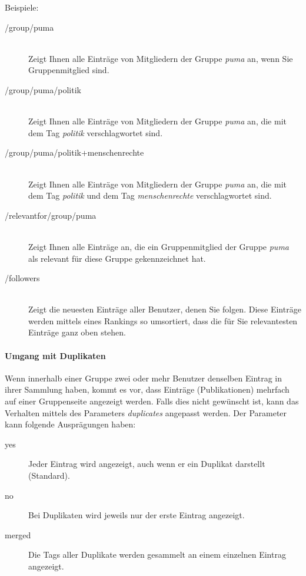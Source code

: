 Beispiele:
\begin{description}
    \item [/group/puma] \hfill \\
    Zeigt Ihnen alle Einträge von Mitgliedern der Gruppe \textit{puma} an, wenn Sie Gruppenmitglied sind.
    \item [/group/puma/politik] \hfill \\
    Zeigt Ihnen alle Einträge von Mitgliedern der Gruppe \textit{puma} an, die mit dem Tag \textit{politik} verschlagwortet sind. 
    \item [/group/puma/politik+menschenrechte] \hfill \\
    Zeigt Ihnen alle Einträge von Mitgliedern der Gruppe \textit{puma} an, die mit dem Tag \textit{politik} und dem Tag \textit{menschenrechte} verschlagwortet sind. 
    \item [/relevantfor/group/puma] \hfill \\
    Zeigt Ihnen alle Einträge an, die ein Gruppenmitglied der Gruppe \textit{puma} als relevant für diese Gruppe gekennzeichnet hat.
    \item [/followers] \hfill \\
    Zeigt die neuesten Einträge aller Benutzer, denen Sie folgen. Diese Einträge werden mittels eines Rankings so umsortiert, dass die für Sie relevantesten Einträge ganz oben stehen. 
\end{description}



\paragraph*{Umgang mit Duplikaten}
\label{subsec:duplikate}
Wenn innerhalb einer Gruppe zwei oder mehr Benutzer denselben Eintrag in ihrer Sammlung haben, kommt es vor, dass Einträge (Publikationen) mehrfach auf einer Gruppenseite angezeigt werden. Falls dies nicht gewünscht ist, kann das Verhalten mittels des Parameters \textit{duplicates} angepasst werden. Der Parameter kann folgende Ausprägungen haben:
\begin{description}
\item [yes] Jeder Eintrag wird angezeigt, auch wenn er ein Duplikat darstellt (Standard).
  \item[no] Bei Duplikaten wird jeweils nur der erste Eintrag angezeigt.
  \item [merged] Die Tags aller Duplikate werden gesammelt an einem einzelnen Eintrag angezeigt.
  \end{description}

